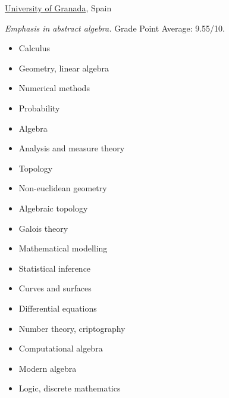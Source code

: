\documentclass[nocolors]{friggeri-cv-a4}
\begin{document}
\begin{entrylist}


{\href{http://www.ugr.es/en/}{University of Granada}, Spain}
{\emph{Emphasis in abstract algebra.} Grade Point Average: 9.55/10.
  {\small
  \begin{multicols}{2}
    \begin{itemize}[topsep=0pt]
    \item Calculus
    \item Geometry, linear algebra
    \item Numerical methods
    \item Probability
    \item Algebra
    \item Analysis and measure theory
    \item Topology
    \item Non-euclidean geometry
    \item Algebraic topology
    \item Galois theory
    \item Mathematical modelling
    \item Statistical inference
    \item Curves and surfaces
    \item Differential equations
    \item Number theory, criptography
    \item Computational algebra
    \item Modern algebra
    \item Logic, discrete mathematics
    \end{itemize}
  \end{multicols}
  }
}


\end{entrylist}
\end{document}

